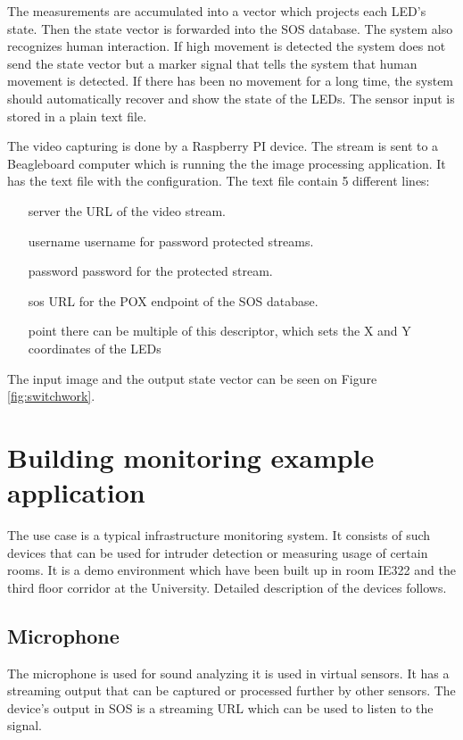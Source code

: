The measurements are accumulated into a vector which projects each LED's state. Then the state vector is forwarded into the SOS database. The system also recognizes human interaction. If high movement is detected the system does not send the state vector but a marker signal that tells the system that human movement is detected. If there has been no movement for a long time, the system should automatically recover and show the state of the LEDs. The sensor input is stored in a plain text file.

The video capturing is done by a Raspberry PI device. The stream is sent to a Beagleboard computer which is running the the image processing application. It has the text file with the configuration. The text file contain 5 different lines:
\begin{itemize}
	\item[server] the URL of the video stream.
	\item[username] username for password protected streams.
	\item[password] password for the protected stream.
	\item[sos] URL for the POX endpoint of the SOS database.
	\item[point] there can be multiple of this descriptor, which sets the X and Y coordinates of the LEDs
\end{itemize}	
The input image and the output state vector can be seen on Figure \ref{fig:switchwork}.


\section{Building monitoring example application}

The use case is a typical infrastructure monitoring system. It consists of such devices that can be used for intruder detection or measuring usage of certain rooms. It is a demo environment which have been built up in room IE322 and the third floor corridor at the University.
Detailed description of the devices follows.

\subsection*{Microphone}
 The microphone is used for sound analyzing it is used in virtual sensors. It has a streaming output that can be captured or processed further by other sensors. The device's output in SOS is a streaming URL which can be used to listen to the signal. 
 
